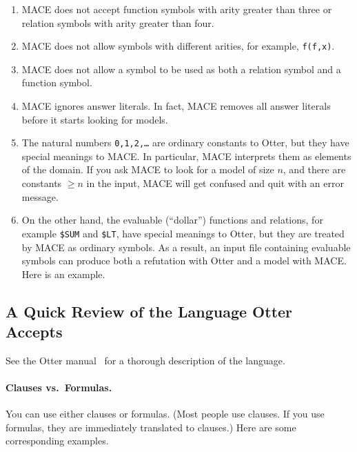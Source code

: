 \documentclass[11pt]{article}
\begin{document}
\begin{enumerate}
\item MACE does not accept function symbols with arity
greater than three or relation symbols with arity greater
than four.
\item MACE does not allow symbols with different arities,
for example, \texttt{f(f,x)}.
\item MACE does not allow a symbol to be used as both a
relation symbol and a function symbol.
\item
MACE ignores answer literals.  In fact, MACE removes all
answer literals before it starts looking for models.
\item
The natural numbers \texttt{0,1,2,\ldots} are ordinary
constants to Otter, but they have special meanings to MACE.
In particular, MACE interprets them as elements of the domain.
If you ask MACE to look for a model of size $n$, and there are constants
$\geq n$ in the input, MACE will get confused and quit with an error message.
\item
On the other hand,
the evaluable (``dollar'') functions and relations, for example \texttt{\$SUM}
and \texttt{\$LT}, have special meanings to Otter, but they are treated by
MACE as ordinary symbols.  As a result, an input file containing
evaluable symbols can produce both a refutation with Otter and a model
with MACE.  Here is an example.
\end{enumerate}
\begin{center}
\begin{small}
\end{small}
\end{center}

\subsection{A Quick Review of the Language Otter Accepts} \label{syntax}

See the Otter manual~\cite{otter3} for a thorough description of the language.

\paragraph{Clauses vs.~Formulas.}  You can use either clauses
or formulas.  (Most people use clauses.  If you use formulas,
they are immediately translated to clauses.)  Here are some
corresponding examples.
\end{document}
